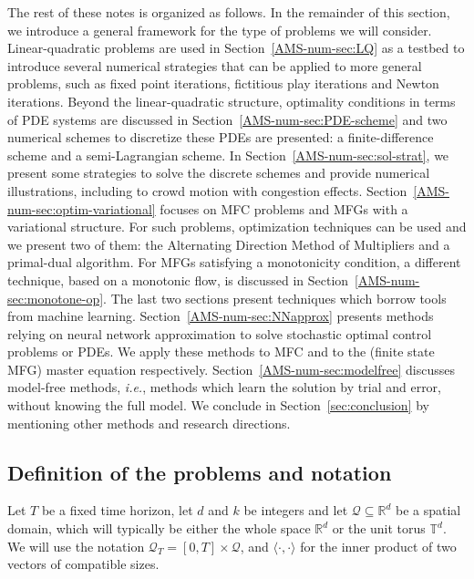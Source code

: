 \documentclass{amsproc}
\theoremstyle{definition}
\theoremstyle{remark}
\numberwithin{equation}{section}
\newcommand{\RR}{{\mathbb R}}
\newcommand{\TT}{{\mathbb T}}
\newcommand{\ctrldim}{k}
\newcommand{\dom}{\mathcal{Q}}
\newcommand{\domT}{\mathcal{Q}_{T}}
\begin{document}
The rest of these notes is organized as follows. In the remainder of this section, we introduce a general framework for the type of problems we will consider.  Linear-quadratic problems are used in Section~\ref{AMS-num-sec:LQ} as a testbed to introduce several numerical strategies that can be applied to more general problems, such as fixed point iterations, fictitious play iterations and Newton iterations. Beyond the linear-quadratic structure, optimality conditions in terms of PDE systems are discussed in Section~\ref{AMS-num-sec:PDE-scheme} and two numerical schemes to discretize these PDEs are presented: a finite-difference scheme and a semi-Lagrangian scheme. In Section~\ref{AMS-num-sec:sol-strat}, we present some strategies to solve the discrete schemes and provide numerical illustrations, including to crowd motion with congestion effects. Section~\ref{AMS-num-sec:optim-variational} focuses on MFC problems and MFGs with a variational structure. For such problems, optimization techniques can be used and we present two of them: the Alternating Direction Method of Multipliers and a primal-dual algorithm. For MFGs satisfying a monotonicity condition, a different technique, based on a monotonic flow, is discussed in Section~\ref{AMS-num-sec:monotone-op}. The last two sections present techniques which borrow tools from machine learning. Section~\ref{AMS-num-sec:NNapprox} presents methods relying on neural network approximation to solve stochastic optimal control problems or PDEs. We apply these methods to MFC and to the (finite state MFG) master equation respectively. Section~\ref{AMS-num-sec:modelfree} discusses model-free methods, \textit{i.e.}, methods which learn the solution by trial and error, without knowing the full model. We conclude in Section~\ref{sec:conclusion} by mentioning other methods and research directions. 



\subsection{Definition of the problems and notation}

Let $T$ be a fixed time horizon, let $d$ and $\ctrldim$ be integers and let $\dom \subseteq \RR^d$ be a spatial domain, which will typically be either the whole space $\RR^d$ or the unit torus $\TT^d$. We will use the notation $\domT = [0,T] \times \dom$, and $\langle \cdot, \cdot \rangle$ for the inner product of two vectors of compatible sizes.
\end{document}
